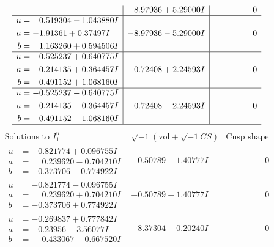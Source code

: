 \documentclass[1p]{elsarticle_modified}
\theoremstyle{definition}
\newcommand{\I}{\sqrt{-1}}
\begin{document}
$$\begin{array}{c|c|c}
 & -8.97936 + 5.29000 I & \phantom{-0.000000 } 0 \\ \hline\begin{aligned}
u &= \phantom{-}0.519304 - 1.043880 I \\
a &= -1.91361 + 0.37497 I \\
b &= \phantom{-}1.163260 + 0.594506 I\end{aligned}
 & -8.97936 - 5.29000 I & \phantom{-0.000000 } 0 \\ \hline\begin{aligned}
u &= -0.525237 + 0.640775 I \\
a &= -0.214135 + 0.364457 I \\
b &= -0.491152 + 1.068160 I\end{aligned}
 & \phantom{-}0.72408 + 2.24593 I & \phantom{-0.000000 } 0 \\ \hline\begin{aligned}
u &= -0.525237 - 0.640775 I \\
a &= -0.214135 - 0.364457 I \\
b &= -0.491152 - 1.068160 I\end{aligned}
 & \phantom{-}0.72408 - 2.24593 I & \phantom{-0.000000 } 0\\
 \hline 
 \end{array}$$\newpage$$\begin{array}{c|c|c}  
\text{Solutions to }I^u_{1}& \I (\text{vol} + \sqrt{-1}CS) & \text{Cusp shape}\\
 \hline 
\begin{aligned}
u &= -0.821774 + 0.096755 I \\
a &= \phantom{-}0.239620 - 0.704210 I \\
b &= -0.373706 - 0.774922 I\end{aligned}
 & -0.50789 - 1.40777 I & \phantom{-0.000000 } 0 \\ \hline\begin{aligned}
u &= -0.821774 - 0.096755 I \\
a &= \phantom{-}0.239620 + 0.704210 I \\
b &= -0.373706 + 0.774922 I\end{aligned}
 & -0.50789 + 1.40777 I & \phantom{-0.000000 } 0 \\ \hline\begin{aligned}
u &= -0.269837 + 0.777842 I \\
a &= -0.23956 - 3.56077 I \\
b &= \phantom{-}0.433067 - 0.667520 I\end{aligned}
 & -8.37304 - 0.20240 I & \phantom{-0.000000 } 0 \\ \hline\begin{aligned}

\end{aligned}
\end{array}$$
\end{document}

